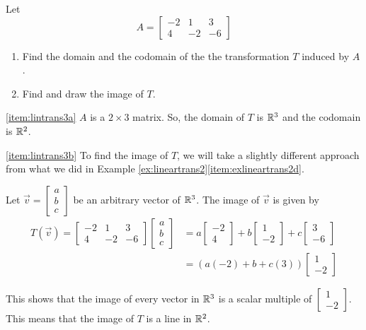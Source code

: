 \documentclass{ximera}
\begin{document}
\begin{example}\label{ex:lineartrans3}
Let $$A=\begin{bmatrix}
-2&1&3\\
4&-2&-6
\end{bmatrix}$$
\begin{enumerate}
\item\label{item:lintrans3a}
Find the domain and the codomain of the the transformation $T$ induced by $A$.  
\item\label{item:lintrans3b}
Find and draw the image of $T$.
\end{enumerate}
\begin{explanation}
\ref{item:lintrans3a} $A$ is a $2\times 3$ matrix.  So, the domain of $T$ is $\mathbb{R}^3$ and the codomain is $\mathbb{R}^2$.

\ref{item:lintrans3b} To find the image of $T$, we will take a slightly different approach from what we did in Example \ref{ex:lineartrans2}\ref{item:exlineartrans2d}.

Let $\vec{v}=\begin{bmatrix}a\\b\\c\end{bmatrix}$ be an arbitrary vector of $\mathbb{R}^3$.
The image of $\vec{v}$ is given by
\begin{align*}T(\vec{v})=\begin{bmatrix}
-2&1&3\\
4&-2&-6
\end{bmatrix}\begin{bmatrix}a\\b\\c\end{bmatrix}&=a\begin{bmatrix}-2\\4\end{bmatrix}+b\begin{bmatrix}1\\-2\end{bmatrix}+c\begin{bmatrix}3\\-6\end{bmatrix}\\
&=(a(-2)+b+c(3))\begin{bmatrix}1\\-2\end{bmatrix}
\end{align*}

This shows that the image of every vector in $\mathbb{R}^3$ is a scalar multiple of $\begin{bmatrix}1\\-2\end{bmatrix}$.  This means that the image of $T$ is a line in $\mathbb{R}^2$.


\end{explanation}
\end{example}
\end{document}
